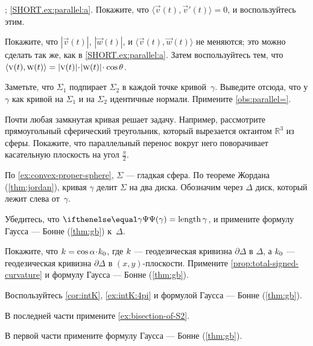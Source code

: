 \begin{multicols}{2}
 
\setcounter{eqtn}{0}

\parbf{\ref{ex:parallel}}; \ref{SHORT.ex:parallel:a}.
Покажите, что $\langle\vec v(t),\vec v'(t)\rangle=0$, и воспользуйтесь этим.

\parit{\ref{SHORT.ex:parallel:b}}
Покажите, что $|\vec v(t)|$, $|\vec w(t)|$, и
$\langle\vec v(t),\vec w(t)\rangle$
не меняются; это можно сделать так же, как в \ref{SHORT.ex:parallel:a}.
Затем воспользуйтесь тем, что 
$\langle\vec v(t),\vec w(t)\rangle\z=|\vec v(t)|\cdot|\vec w(t)|\cdot\cos\theta$.

Заметьте, что $\Sigma_1$ подпирает $\Sigma_2$ в каждой точке кривой~$\gamma$.
Выведите отсюда, что у $\gamma$ как кривой на $\Sigma_1$ и на $\Sigma_2$ идентичные нормали.
Примените \ref{obs:parallel=}.

Почти любая замкнутая кривая решает задачу.
Например, рассмотрите прямоугольный сферический треугольник, который вырезается октантом $\mathbb{R}^3$ из сферы.
Покажите, что параллельный перенос вокруг него поворачивает касательную плоскость на угол $\tfrac\pi 2$.

\setcounter{eqtn}{0}

По \ref{ex:convex-proper-sphere}, $\Sigma$ --- гладкая сфера.
По теореме Жордана (\ref{thm:jordan}), кривая $\gamma$ делит $\Sigma$ на два диска.
Обозначим через $\Delta$ диск, который лежит слева от~$\gamma$.

Убедитесь, что $\tgc\gamma=\length\gamma$, и примените формулу Гаусса --- Бонне (\ref{thm:gb}) к~$\Delta$.

Покажите, что $\skur=\cos\alpha\cdot\skur_0$,
где $k$ --- геодезическая кривизна $\partial \Delta$ в $\Delta$,
а $k_0$ --- геодезическая кривизна $\partial \Delta$ в $(x,y)$-плоскости.
Примените \ref{prop:total-signed-curvature} и формулу Гаусса --- Бонне (\ref{thm:gb}).

Воспользуйтесь \ref{cor:intK}, \ref{ex:intK:4pi} и формулой Гаусса --- Бонне (\ref{thm:gb}).

В последней части примените \ref{ex:bisection-of-S2}.

В первой части примените формулу Гаусса --- Бонне (\ref{thm:gb}).


\end{multicols}
